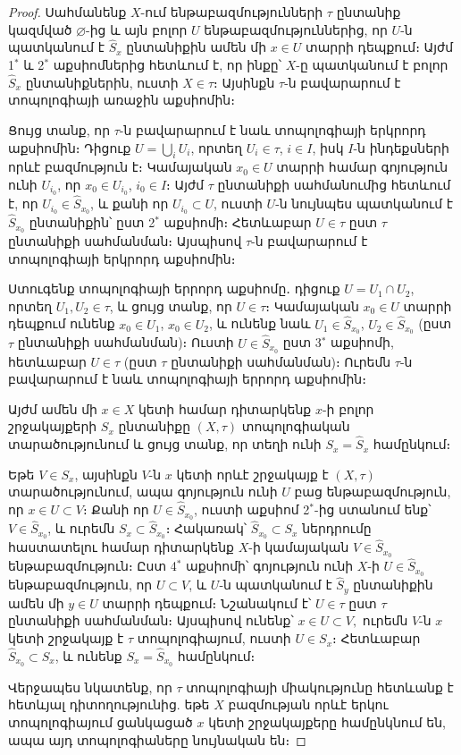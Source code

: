 \documentclass[./main.tex]{subfiles}
\begin{document}
\begin{proof}
Սահմանենք $X$-ում ենթաբազմությունների $\tau$ ընտանիք կազմված $\varnothing$-ից  և այն բոլոր $U$ ենթաբազմություններից, որ $U$-ն պատկանում է $\hat{S}_x$ ընտանիքին  ամեն մի $x\in U$ տարրի դեպքում։ Այժմ 1$^{\ast}$ և 2$^{\ast}$ աքսիոմներից հետևում է, որ ինքը՝ \linebreak $X$-ը պատկանում է բոլոր $\hat{S}_x$ ընտանիքներին, ուստի $X\in \tau$։ Այսինքն $\tau$-ն բավարա\-րում է տոպոլոգիայի առաջին աքսիոմին։

Ցույց տանք, որ $\tau$-ն բավարարում է նաև տոպոլոգիայի երկրորդ աքսիոմին։ Դիցուք $U = \bigcup\limits_i U_i$, որտեղ $U_i \in \tau$, $i\in I$,  իսկ  $I$-ն ինդեքսների որևէ բազմություն է։ Կամայական $x_0 \in U$ տարրի համար գոյություն ունի $U_{i_{0}}$, որ $x_0 \in U_{i_{0}}$, $i_0\in I$։ Այժմ $\tau$ ընտանիքի սահմանումից հետևում է, որ $U_{i_{0}}\in \hat{S}_{x_{0}}$, և քանի որ $U_{i_{0}}\subset U$, ուստի $U$-ն նույնպես պատկանում է $\hat{S}_{x_{0}}$ ընտանիքին՝ ըստ 2$^\ast$ աքսիոմի։ Հետևաբար $U\in \tau$ ըստ $\tau$ ընտանիքի սահմանման։ Այսպիսով $\tau$-ն բավարարում է տոպոլոգիայի երկրորդ աքսիոմին։

Ստուգենք տոպոլոգիայի երրորդ աքսիոմը․ դիցուք ${U = U_1 \cap U_2}$, որտեղ \linebreak ${U_1, U_2 \in \tau}$, և ցույց տանք, որ $U\in\tau$։ Կամայական $x_0 \in U$ տարրի դեպքում ունենք $x_0 \in U_1$, $x_0 \in U_2$, և ունենք նաև $U_1\in \hat{S}_{x_{0}}$, $U_{2}\in \hat{S}_{x_{0}}$ (ըստ $\tau$ ընտանիքի սահմանման)։ Ուստի $U\in \hat{S}_{x_{0}}$ ըստ 3$^\ast$ աքսիոմի, հետևաբար $U\in \tau$ (ըստ $\tau$ ընտանիքի սահմանման)։ Ուրեմն $\tau$-ն բավարարում է նաև տոպոլոգիայի երրորդ աքսիոմին։

Այժմ ամեն մի ${x\in X}$ կետի համար դիտարկենք $x$-ի բոլոր շրջակայքերի $S_x$ ընտա\-նիքը $(X, \tau)$ տոպոլոգիական տարածությունում և ցույց տանք, որ տեղի ունի $S_x = \hat{S}_x$ համընկում։ 

Եթե $V\in S_x$, այսինքն $V$-ն $x$ կետի որևէ շրջակայք է $(X, \tau)$ տարածությունում, ապա գոյություն ունի $U$ բաց ենթաբազմություն, որ ${x\in U \subset V}$։ Քանի որ $U\in \hat{S}_{x_{0}}$, ուստի աքսիոմ 2$^\ast$-ից ստանում ենք՝ ${V \in \hat{S}_{x_{0}}}$, և ուրեմն ${S_x \subset \hat{S}_{x_{0}}}$։ Հակառակ՝ ${\hat{S}_{x_{0}} \subset S_x}$ ներդրումը հաստատելու համար դիտարկենք $X$-ի կամայական $V\in \hat{S}_{x_{0}}$ ենթաբազմություն։ Ըստ 4$^\ast$ աքսիոմի՝ գոյություն ունի $X$-ի $U\in \hat{S}_{x_{0}}$ ենթաբազմու\-թյուն, որ $U\subset V$, և $U$-ն պատկանում է $\hat{S}_{y}$ ընտանիքին ամեն մի $y\in U$ տարրի դեպքում։ Նշանակում է՝ $U\in \tau$ ըստ $\tau$ ընտանիքի սահմանման։ Այսպիսով ունենք՝ $x\in U \subset V,$ ուրեմն $V$-ն $x$ կետի շրջակայք է $\tau$ տոպոլոգիայում, ուստի $U \in S_x$։ Հետևաբար $\hat{S}_{x_{0}} \subset S_x$, և ունենք $S_x = \hat{S}_{x_{0}}$ համընկում։
        
Վերջապես նկատենք, որ $\tau$ տոպոլոգիայի միակությունը հետևանք է հետևյալ դիտողությունից. եթե $X$ բազմության որևէ երկու տոպոլոգիայում ցանկացած $x$ կետի շրջակայքերը համընկնում են, ապա այդ տոպոլոգիաները նույնական են։
\end{proof}


\newpage

\end{document}
